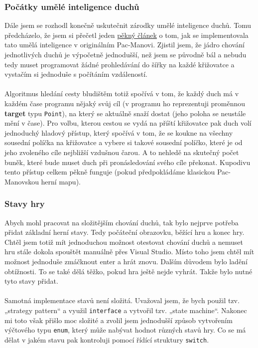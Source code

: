 \documentclass[a4]{article}
\begin{document}
\subsubsection{Počátky umělé inteligence duchů}
Dále jsem se rozhodl konečně uskutečnit zárodky umělé inteligence duchů. Tomu předcházelo, že jsem si přečetl jeden \href{https://www.gamedeveloper.com/design/the-pac-man-dossier}{pěkný článek} o tom, jak se implementovala tato umělá inteligence v originálním Pac-Manovi. Zjistil jsem, že jádro chování jednotlivých duchů je výpočetně jednodušší, než jsem se původně bál a nebudu tedy muset programovat žádné prohledávání do šířky na každé křižovatce a vystačím si jednoduše s počítáním vzdáleností. 
\\\\
Algoritmus hledání cesty bludištěm totiž spočívá v tom, že každý duch má v každém čase programu nějaký svůj cíl (v programu ho reprezentuji proměnnou \textbf{target} typu \verb|Point|), na který se aktuálně snaží dostat (jeho poloha se neustále mění v čase). Pro volbu, kterou cestou se vydá na příští křižovatce pak duch volí jednoduchý hladový přístup, který spočívá v tom, že se koukne na všechny sousední políčka na křižovatce a vybere si takové sousední políčko, které je od jeho zvoleného cíle nejbližší vzdušnou čarou. A to nehledě na skutečný počet buněk, které bude muset duch při pronásledování svého cíle překonat. Kupodivu tento přístup celkem pěkně funguje (pokud předpokládáme klasickou Pac-Manovskou herní mapu).
\subsubsection{Stavy hry}
Abych mohl pracovat na složitějším chování duchů, tak bylo nejprve potřeba přidat základní herní stavy. Tedy počáteční obrazovku, běžící hru a konec hry. Chtěl jsem totiž mít jednoduchou možnost otestovat chování duchů a nemuset hru stále dokola spouštět manuálně přes Visual Studio. Místo toho jsem chtěl mít možnost jednoduše zmáčknout enter a hrát znovu. Dalším důvodem bylo ladění obtížnosti. To se také dělá těžko, pokud hra ještě nejde vyhrát. Takže bylo nutné tyto stavy přidat.
\\\\
Samotná implementace stavů není složitá. Uvažoval jsem, že bych použil tzv. „strategy pattern“ a využil \verb|interface| a vytvořil tzv. „state machine“. Nakonec mi toto však přišlo moc složité a zvolil jsem jednodušší způsob vytvořením výčtového typu \verb|enum|, který může nabývat hodnot různých stavů hry. Co se má dělat v jakém stavu pak kontroluji pomocí řídící struktury \verb|switch|.
\end{document}
